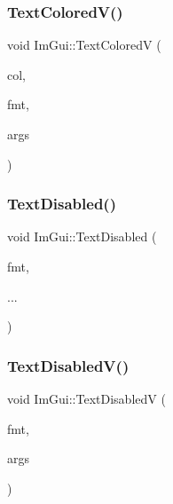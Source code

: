 \subsubsection{\texorpdfstring{Text\+Colored\+V()}{TextColoredV()}}
{\footnotesize\ttfamily void Im\+Gui\+::\+Text\+ColoredV (\begin{DoxyParamCaption}\item[{const \hyperlink{struct_im_vec4}{Im\+Vec4} \&}]{col,  }\item[{const char $\ast$}]{fmt,  }\item[{va\+\_\+list}]{args }\end{DoxyParamCaption})}

\hypertarget{namespace_im_gui_aa96bf14c5fa288e106820aeb4ba7fcb6}{}\label{namespace_im_gui_aa96bf14c5fa288e106820aeb4ba7fcb6} 
\subsubsection{\texorpdfstring{Text\+Disabled()}{TextDisabled()}}
{\footnotesize\ttfamily void Im\+Gui\+::\+Text\+Disabled (\begin{DoxyParamCaption}\item[{const char $\ast$}]{fmt,  }\item[{}]{... }\end{DoxyParamCaption})}

\hypertarget{namespace_im_gui_a5b128d4f12d7e33e95fb9cef7dce027e}{}\label{namespace_im_gui_a5b128d4f12d7e33e95fb9cef7dce027e} 
\subsubsection{\texorpdfstring{Text\+Disabled\+V()}{TextDisabledV()}}
{\footnotesize\ttfamily void Im\+Gui\+::\+Text\+DisabledV (\begin{DoxyParamCaption}\item[{const char $\ast$}]{fmt,  }\item[{va\+\_\+list}]{args }\end{DoxyParamCaption})}

\hypertarget{namespace_im_gui_a96a5f42789ecc419b2ae8af7b2acc28e}{}\label{namespace_im_gui_a96a5f42789ecc419b2ae8af7b2acc28e} 
